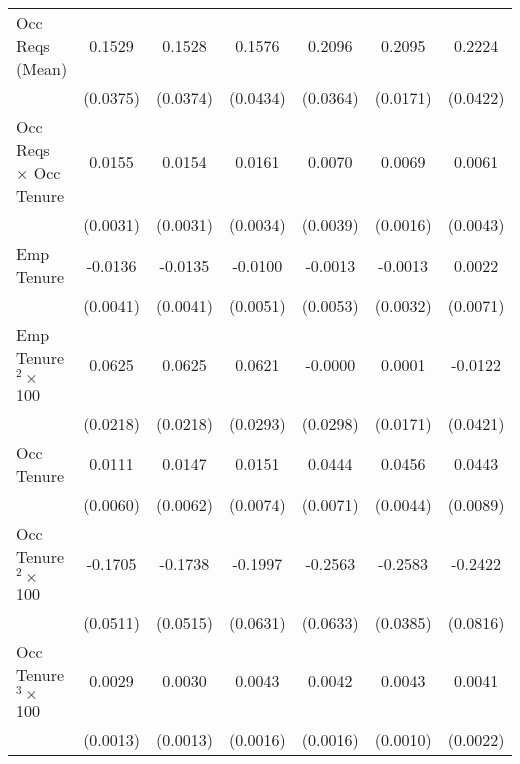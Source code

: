 {\begin{longtable}{l*{6}{c}}
Occ Reqs (Mean)     &      0.1529\sym{***}&      0.1528\sym{***}&      0.1576\sym{***}&      0.2096\sym{***}&      0.2095\sym{***}&      0.2224\sym{***}\\
                    &    (0.0375)         &    (0.0374)         &    (0.0434)         &    (0.0364)         &    (0.0171)         &    (0.0422)         \\
Occ Reqs $\times$ Occ Tenure&      0.0155\sym{***}&      0.0154\sym{***}&      0.0161\sym{***}&      0.0070\sym{*}  &      0.0069\sym{***}&      0.0061         \\
                    &    (0.0031)         &    (0.0031)         &    (0.0034)         &    (0.0039)         &    (0.0016)         &    (0.0043)         \\
Emp Tenure          &     -0.0136\sym{***}&     -0.0135\sym{***}&     -0.0100\sym{*}  &     -0.0013         &     -0.0013         &      0.0022         \\
                    &    (0.0041)         &    (0.0041)         &    (0.0051)         &    (0.0053)         &    (0.0032)         &    (0.0071)         \\
Emp Tenure$^2\times$ 100&      0.0625\sym{***}&      0.0625\sym{***}&      0.0621\sym{**} &     -0.0000         &      0.0001         &     -0.0122         \\
                    &    (0.0218)         &    (0.0218)         &    (0.0293)         &    (0.0298)         &    (0.0171)         &    (0.0421)         \\
Occ Tenure          &      0.0111\sym{*}  &      0.0147\sym{**} &      0.0151\sym{**} &      0.0444\sym{***}&      0.0456\sym{***}&      0.0443\sym{***}\\
                    &    (0.0060)         &    (0.0062)         &    (0.0074)         &    (0.0071)         &    (0.0044)         &    (0.0089)         \\
Occ Tenure$^2\times$ 100&     -0.1705\sym{***}&     -0.1738\sym{***}&     -0.1997\sym{***}&     -0.2563\sym{***}&     -0.2583\sym{***}&     -0.2422\sym{***}\\
                    &    (0.0511)         &    (0.0515)         &    (0.0631)         &    (0.0633)         &    (0.0385)         &    (0.0816)         \\
Occ Tenure$^3\times$ 100&      0.0029\sym{**} &      0.0030\sym{**} &      0.0043\sym{***}&      0.0042\sym{***}&      0.0043\sym{***}&      0.0041\sym{*}  \\
                    &    (0.0013)         &    (0.0013)         &    (0.0016)         &    (0.0016)         &    (0.0010)         &    (0.0022)         \\

\end{longtable}}
